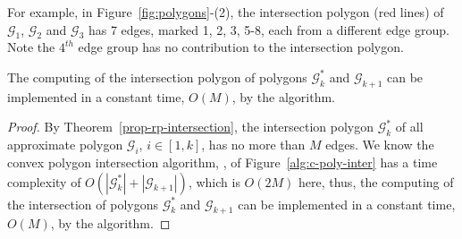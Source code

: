For example, in Figure~\ref{fig:polygons}-(2), the intersection polygon (red lines) of $\mathcal{G}_1$, $\mathcal{G}_2$ and $\mathcal{G}_3$ has 7 edges, marked 1, 2, 3, 5-8, each from a different edge group. Note the $4^{th}$ edge group has no contribution to the intersection polygon.

\begin{cor}
\label{prop-cpi-time}
The computing of the intersection polygon of polygons $\mathcal{G}^*_k$ and $\mathcal{G}_{k+1}$ can be implemented in a constant time, \ie $O(M)$, by the \cpia algorithm.
\end{cor}

\begin{proof}
By Theorem~\ref{prop-rp-intersection}, the intersection polygon $\mathcal{G}^*_k$ of all approximate polygon $\mathcal{G}_i$, $i \in [1, k]$, has no more than $M$ edges.
We know the convex polygon intersection algorithm, \ie \cpia, of Figure~\ref{alg:c-poly-inter} has a time complexity of $O(|\mathcal{G}^*_k| + |\mathcal{G}_{k+1}|)$, which is $O(2M)$ here, thus, the computing of the intersection of polygons $\mathcal{G}^*_k$ and $\mathcal{G}_{k+1}$ can be implemented in a constant time, \ie $O(M)$, by the \cpia algorithm.
\end{proof}








